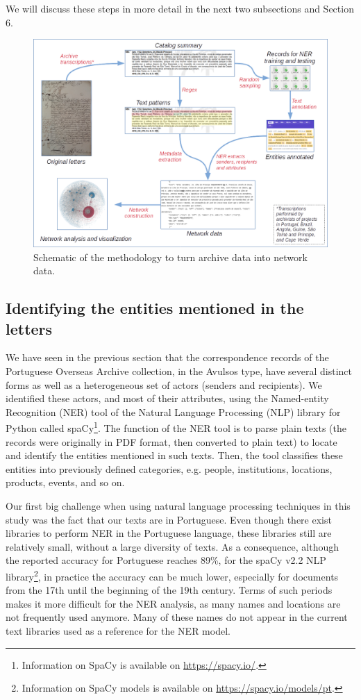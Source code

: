 \documentclass{article}
\begin{document}
We will discuss these steps in more detail in the next two subsections and Section 6.

\begin{figure}
	\centering
	\includegraphics[scale=0.40]{methods_diagramv2.png}
	\caption{Schematic of the methodology to turn archive data into network data.}
	\label{fig:methods}
\end{figure}

\subsection{Identifying the entities mentioned in the letters}

We have seen in the previous section that the correspondence records of the Portuguese Overseas Archive collection, in the Avulsos type, have several distinct forms as well as a heterogeneous set of actors (senders and recipients). We identified these actors, and most of their attributes, using the Named-entity Recognition (NER) tool of the Natural Language Processing (NLP) library for Python called spaCy\footnote{Information on SpaCy is available on \url{https://spacy.io/}.}. The function of the NER tool is to parse plain texts (the records were originally in PDF format, then converted to plain text) to locate and identify the entities mentioned in such texts. Then, the tool classifies these entities into previously defined categories, e.g. people, institutions, locations, products, events, and so on.

Our first big challenge when using natural language processing techniques in this study was the fact that our texts are in Portuguese. Even though there exist libraries to perform NER in the Portuguese language, these libraries still are relatively small, without a large diversity of texts. As a consequence, although the reported accuracy for Portuguese reaches 89\%, for the spaCy v2.2 NLP library\footnote{Information on SpaCy models is available on \url{https://spacy.io/models/pt}.}, in practice the accuracy can be much lower, especially for documents from the 17th until the beginning of the 19th century. Terms of such periods makes it more difficult for the NER analysis, as many names and locations are not frequently used anymore. Many of these names do not appear in the current text libraries used as a reference for the NER model.
\end{document}
